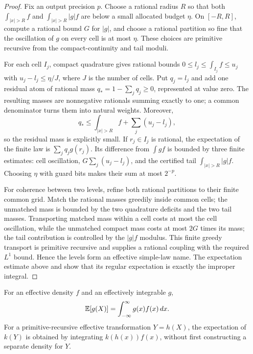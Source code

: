 \begin{proof}
Fix an output precision \(p\).  Choose a rational radius \(R\) so that both
\(\int_{|x|>R}f\) and \(\int_{|x|>R}|g|f\) are below a small allocated
budget \(\eta\).  On \([-R,R]\), compute a rational bound \(G\) for
\(|g|\), and choose a rational partition so fine that the oscillation of
\(g\) on every cell is at most \(\eta\).  These choices are primitive
recursive from the compact-continuity and tail moduli.

For each cell \(I_j\), compact quadrature gives rational bounds
\(0\le l_j\le\int_{I_j}f\le u_j\) with
\(u_j-l_j\le\eta/J\), where \(J\) is the number of cells.  Put
\(q_j=l_j\) and add one residual atom of rational mass
\(q_*=1-\sum_jq_j\ge0\), represented at value zero.  The resulting masses
are nonnegative rationals summing exactly to one; a common denominator turns
them into natural weights.  Moreover,
\[
 q_*\le \int_{|x|>R}f+\sum_j(u_j-l_j),
\]
so the residual mass is explicitly small.  If \(r_j\in I_j\) is rational,
the expectation of the finite law is \(\sum_jq_jg(r_j)\).  Its difference
from \(\int gf\) is bounded by three finite estimates: cell oscillation,
\(G\sum_j(u_j-l_j)\), and the certified tail \(\int_{|x|>R}|g|f\).
Choosing \(\eta\) with guard bits makes their sum at most \(2^{-p}\).

For coherence between two levels, refine both rational partitions to their
finite common grid.  Match the rational masses greedily inside common cells;
the unmatched mass is bounded by the two quadrature deficits and the two tail
masses.  Transporting matched mass within a cell costs at most the cell
oscillation, while the unmatched compact mass costs at most \(2G\) times its
mass; the tail contribution is controlled by the \(|g|f\) modulus.  This
finite greedy transport is primitive recursive and supplies a rational
coupling with the required \(L^1\) bound.  Hence the levels form an effective
simple-law name.  The expectation estimate above and
 show that its regular expectation is exactly the improper
integral.
\end{proof}

\begin{theorem}\label{thm:continuous-lotus}
For an effective density \(f\) and an effectively integrable \(g\),
\[
 \mathbb E[g(X)]=\int_{-\infty}^{\infty}g(x)f(x)\,dx.
\]
For a primitive-recursive effective transformation \(Y=h(X)\), the expectation
of \(k(Y)\) is obtained by integrating \(k(h(x))f(x)\), without first
constructing a separate density for \(Y\).
\end{theorem}

